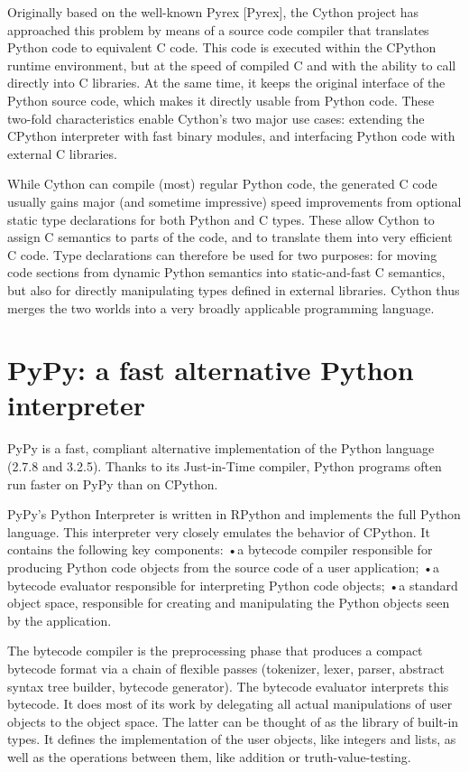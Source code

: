 Originally based on the well-known Pyrex [Pyrex], the Cython project has approached this problem by means of a source code compiler that translates Python code to equivalent C code. This code is executed within the CPython runtime environment, but at the speed of compiled C and with the ability to call directly into C libraries. At the same time, it keeps the original interface of the Python source code, which makes it directly usable from Python code. These two-fold characteristics enable Cython’s two major use cases: extending the CPython interpreter with fast binary modules, and interfacing Python code with external C libraries.

While Cython can compile (most) regular Python code, the generated C code usually gains major (and sometime impressive) speed improvements from optional static type declarations for both Python and C types. These allow Cython to assign C semantics to parts of the code, and to translate them into very efficient C code. Type declarations can therefore be used for two purposes: for moving code sections from dynamic Python semantics into static-and-fast C semantics, but also for directly manipulating types defined in external libraries. Cython thus merges the two worlds into a very broadly applicable programming language.




\newpage
\section{PyPy: a fast alternative Python interpreter}


PyPy is a fast, compliant alternative implementation of the Python language (2.7.8 and 3.2.5). Thanks to its Just-in-Time compiler, Python programs often run faster on PyPy than on CPython.

PyPy’s Python Interpreter is written in RPython and implements the full Python language. This interpreter very closely emulates the behavior of CPython. It contains the following key components:
•a bytecode compiler responsible for producing Python code objects from the source code of a user application;
•a bytecode evaluator responsible for interpreting Python code objects;
•a standard object space, responsible for creating and manipulating the Python objects seen by the application.

The bytecode compiler is the preprocessing phase that produces a compact bytecode format via a chain of flexible passes (tokenizer, lexer, parser, abstract syntax tree builder, bytecode generator). The bytecode evaluator interprets this bytecode. It does most of its work by delegating all actual manipulations of user objects to the object space. The latter can be thought of as the library of built-in types. It defines the implementation of the user objects, like integers and lists, as well as the operations between them, like addition or truth-value-testing.

